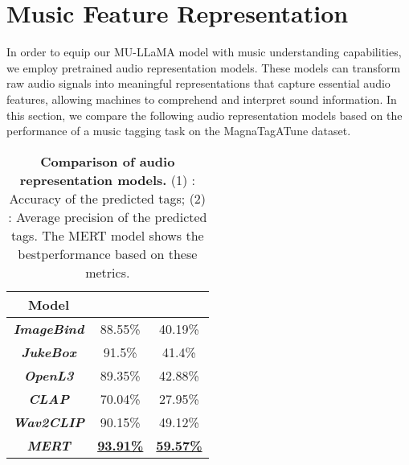 \documentclass{article}
\begin{document}
\vspace{-0.2cm}
\section{Music Feature Representation}
\label{sec:music_rep}
\vspace{-0.2cm}

\noindent
In order to equip our MU-LLaMA model with music understanding capabilities, we employ pretrained audio representation models. These models can transform raw audio signals into meaningful representations that capture essential audio features, allowing machines to comprehend and interpret sound information. In this section, we compare the following audio representation models based on the performance of a music tagging task on the MagnaTagATune \cite{9aed49b956a24e99b044582665fd5b21} dataset.

\begin{table}[htbp]
\centering
\def\arraystretch{1.1}\caption{\textbf{Comparison of audio representation models.} (1) : Accuracy of the predicted tags; (2) : Average precision of the predicted tags. The MERT model shows the bestperformance based on these metrics.}
\begin{tabular}{c|c|c}
\hline\hline
Model                       & \textbf{}      & \textbf{}       \\ \hline\hline
\textit{\textbf{ImageBind}} & 88.55\%                & 40.19\%                \\
\textit{\textbf{JukeBox}}   & 91.5\%                 & 41.4\%                 \\
\textit{\textbf{OpenL3}}    & 89.35\%                & 42.88\%                \\
\textit{\textbf{CLAP}}      & 70.04\%                & 27.95\%                \\
\textit{\textbf{Wav2CLIP}}  & 90.15\%                & 49.12\%                \\
\textit{\textbf{MERT}}      & {\underline{\textbf{93.91\%}}} & {\underline{\textbf{59.57\%}}} \\ \hline\hline
\end{tabular}
\label{musictagging}
\end{table}
\end{document}
